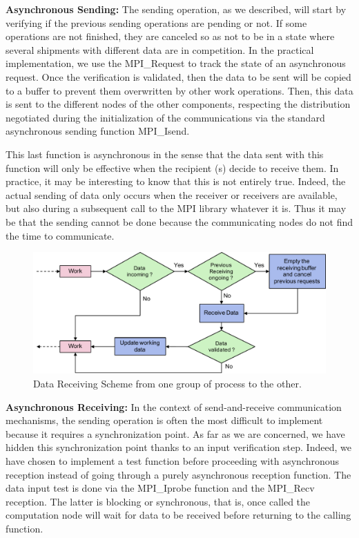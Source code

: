 \textbf{Asynchronous Sending:} The sending operation, as we described, will start by verifying if the previous sending operations are pending or not. If some operations are not finished, they are canceled so as not to be in a state where several shipments with different data are in competition. In the practical implementation, we use the MPI\_Request to track the state of an asynchronous request. Once the verification is validated, then the data to be sent will be copied to a buffer to prevent them overwritten by other work operations. Then, this data is sent to the different nodes of the other components, respecting the distribution negotiated during the initialization of the communications via the standard asynchronous sending function MPI\_Isend.

This last function is asynchronous in the sense that the data sent with this function will only be effective when the recipient (s) decide to receive them. In practice, it may be interesting to know that this is not entirely true. Indeed, the actual sending of data only occurs when the receiver or receivers are available, but also during a subsequent call to the MPI library whatever it is. Thus it may be that the sending cannot be done because the communicating nodes do not find the time to communicate. 

\begin{figure}[t]
	\centering
	\includegraphics[width=6.2in]{fig/recv.pdf}
	\caption{Data Receiving Scheme from one group of process to the other.}
	\label{fig:recv}
\end{figure}

\textbf{Asynchronous Receiving:} In the context of send-and-receive communication mechanisms, the sending operation is often the most difficult to implement because it requires a synchronization point. As far as we are concerned, we have hidden this synchronization point thanks to an input verification step. Indeed, we have chosen to implement a test function before proceeding with asynchronous reception instead of going through a purely asynchronous reception function. The data input test is done via the MPI\_Iprobe function and the MPI\_Recv reception. The latter is blocking or synchronous, that is, once called the computation node will wait for data to be received before returning to the calling function. 

